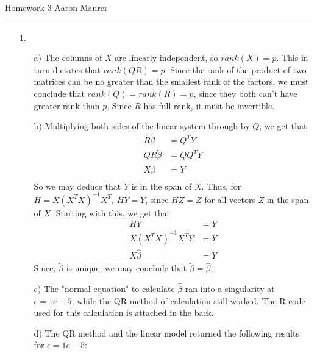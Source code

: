\documentclass[11pt]{article}
\theoremstyle{definition}
\begin{document}
Homework 3 \hfill Aaron Maurer
\vspace{2mm}
\hrule
\vspace{2mm}

\begin{itemize}
    \item[1.]
        \begin{itemize}
            \item[a)]
                The columns of $X$ are linearly independent, so \(rank(X)=p\). This in turn dictates that \(rank(QR)=p\). Since the rank of the product of two matrices can be no greater than the smallest rank of the factors, we must conclude that \(rank(Q)=rank(R)=p\), since they both can't have greater rank than $p$. Since $R$ has full rank, it must be invertible.
            \item[b)]
                Multiplying both sides of the linear system through by $Q$, we get that
                \begin{align*}
                    R \tilde\beta &= Q^TY \\
                    QR \tilde\beta &= QQ^TY \\
                    X\tilde\beta &= Y \\
                \end{align*}
                So we may deduce that $Y$ is in the span of $X$. Thus, for $H=X(X^TX)^{-1}X^T$, $HY=Y$, since $HZ=Z$ for all vectors $Z$ in the span of $X$. Starting with this, we get that
                \begin{align*}
                    HY &=Y \\
                    X(X^TX)^{-1}X^TY &= Y \\
                    X \hat\beta &= Y
                \end{align*}
                Since, $\tilde\beta$ is unique, we may conclude that $\tilde\beta=\hat\beta$.
            \item[c)]
                The "normal equation" to calculate $\hat\beta$ ran into a singularity at $\epsilon=1e-5$, while the QR method of calculation still worked. The R code used for this calculation is attached in the back.
            \item[d)]
                The QR method and the linear model returned the following results for $\epsilon=1e-5$: \\
                \begin{tabular}{l | l l}

\end{tabular}
\end{itemize}
\end{itemize}
\end{document}
